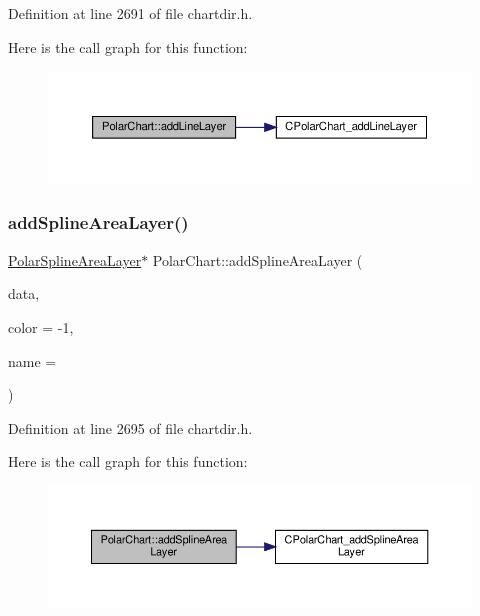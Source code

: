 Definition at line 2691 of file chartdir.\+h.

Here is the call graph for this function\+:
\nopagebreak
\begin{figure}[H]
\begin{center}
\leavevmode
\includegraphics[width=350pt]{class_polar_chart_a5d54191f10884a95b52f3098a4e33c3c_cgraph}
\end{center}
\end{figure}
\mbox{\label{class_polar_chart_a490b2bb4cc48418f66065fa2ba1dd005}} 
\subsubsection{\texorpdfstring{add\+Spline\+Area\+Layer()}{addSplineAreaLayer()}}
{\footnotesize\ttfamily \hyperlink{class_polar_spline_area_layer}{Polar\+Spline\+Area\+Layer}$\ast$ Polar\+Chart\+::add\+Spline\+Area\+Layer (\begin{DoxyParamCaption}\item[{\hyperlink{class_double_array}{Double\+Array}}]{data,  }\item[{int}]{color = {\ttfamily -\/1},  }\item[{const char $\ast$}]{name = {} }\end{DoxyParamCaption})\hspace{0.3cm}{\ttfamily [inline]}}



Definition at line 2695 of file chartdir.\+h.

Here is the call graph for this function\+:
\nopagebreak
\begin{figure}[H]
\begin{center}
\leavevmode
\includegraphics[width=350pt]{class_polar_chart_a490b2bb4cc48418f66065fa2ba1dd005_cgraph}
\end{center}
\end{figure}
\mbox{\label{class_polar_chart_a7f51e9599161df80a632fcb512a9c4fc}} 
